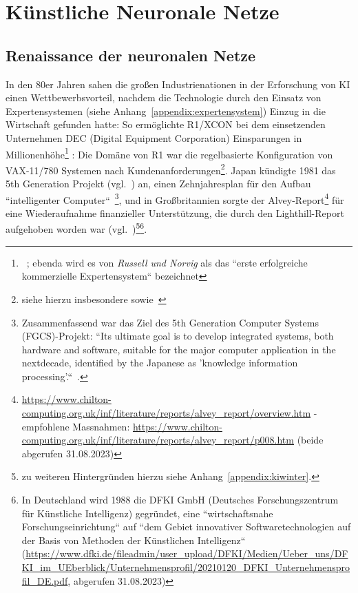 \chapter{Künstliche Neuronale Netze}\label{ch:knn}


\section{Renaissance der neuronalen Netze}\label{renaissance}


In den 80er Jahren sahen die großen Industrienationen in der Erforschung von KI einen Wettbewerbsvorteil, nachdem die Technologie durch den Einsatz von Expertensystemen (siehe Anhang~\ref{appendix:expertensystem}) Einzug in die Wirtschaft gefunden hatte: So ermöglichte R1/XCON bei dem einsetzenden Unternehmen DEC (Digital Equipment Corporation) Einsparungen in Millionenhöhe\footnote{
    ~\cite[48]{RN09}; ebenda wird es von \textit{Russell und Norvig} als das ``erste erfolgreiche kommerzielle Expertensystem`` bezeichnet
} : Die Domäne von R1 war die regelbasierte Konfiguration von VAX-11/780 Systemen nach Kundenanforderungen\footnote{
    siehe hierzu insbesondere \cite{Mcd80} sowie~\cite[63]{Hor90}
}. Japan kündigte 1981 das 5th Generation Projekt (vgl.~\cite{Gar19}) an, einen Zehnjahresplan für den Aufbau ``intelligenter Computer``~\cite[48]{RN09}\footnote{
    Zusammenfassend war das Ziel des 5th Generation Computer Systems (FGCS)-Projekt: ``Its ultimate goal is to develop integrated systems, both hardware and software, suitable for the major computer application in the nextdecade, identified by the Japanese as 'knowledge information processing'.``~\cite[637]{Sha83}.
}, und in Großbritannien sorgte der Alvey-Report\footnote{
    \url{https://www.chilton-computing.org.uk/inf/literature/reports/alvey\_report/overview.htm} - empfohlene Massnahmen: \url{https://www.chilton-computing.org.uk/inf/literature/reports/alvey\_report/p008.htm} (beide abgerufen 31.08.2023)
} für eine Wiederaufnahme finanzieller Unterstützung, die durch den Lighthill-Report aufgehoben worden war (vgl.~\cite[48]{RN09})\footnote{
    zu weiteren Hintergründen hierzu siehe Anhang~\ref{appendix:kiwinter}.
}\footnote{
    In Deutschland wird 1988 die DFKI GmbH (Deutsches Forschungszentrum für Künstliche Intelligenz) gegründet, eine ``wirtschaftsnahe Forschungseinrichtung`` auf ``dem Gebiet innovativer Softwaretechnologien auf der Basis von Methoden der Künstlichen Intelligenz`` (\url{https://www.dfki.de/fileadmin/user\_upload/DFKI/Medien/Ueber\_uns/DFKI\_im\_UEberblick/Unternehmensprofil/20210120\_DFKI\_Unternehmensprofil\_DE.pdf}, abgerufen 31.08.2023)
}.

